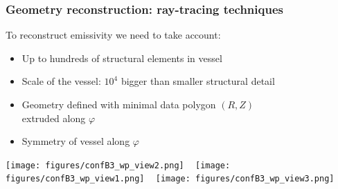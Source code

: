 \documentclass[10pt]{beamer}
\begin{document}
\begin{frame}
\frametitle{Geometry reconstruction: ray-tracing techniques}

	To reconstruct emissivity we need to take account:
	\begin{itemize}
	\item Up to hundreds of structural elements in vessel
	\item Scale of the vessel:
	$10^4$ bigger than smaller structural detail

	\item Geometry defined with minimal data polygon $(R,Z)$\\ extruded along $\varphi$
	\item Symmetry of vessel along $\varphi$

	\end{itemize}

	\vspace{0.5cm}
	\begin{center}
		\texttt{[image: figures/confB3\_wp\_view2.png]}%
		~
		\texttt{[image: figures/confB3\_wp\_view1.png]}%
		~
		\texttt{[image: figures/confB3\_wp\_view3.png]}%
	\end{center}

\end{frame}
\end{document}
